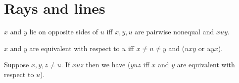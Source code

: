 \documentclass{article}
\newcommand{\Betw}[3]{#1 #2 #3}
\begin{document}
  \section{Rays and lines}

  \begin{forthel}
    \begin{definition}
      $x$ and $y$ lie on opposite sides of $u$ iff
      $x, y, u$ are pairwise nonequal and $\Betw{x}{u}{y}$.
    \end{definition}

    \begin{definition}
      $x$ and $y$ are equivalent with respect to $u$ iff $x\neq u \neq y$ and ($\Betw{u}{x}{y}$ or $\Betw{u}{y}{x}$).
    \end{definition}

    \begin{lemma}
      Suppose $x,y,z \neq u$.
      If $\Betw{x}{u}{z}$
      then we have
        ($\Betw{y}{u}{z}$ iff $x$ and $y$ are equivalent with respect to $u$).
    \end{lemma}
  \end{forthel}
\end{document}
